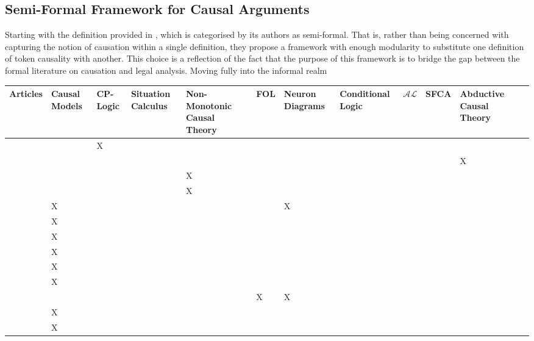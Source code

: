 \documentclass[11pt,a4paper]{book}
\theoremstyle{definition}
\theoremstyle{definition}
\theoremstyle{definition}
\theoremstyle{remark}
\begin{document}
\subsection{Semi-Formal Framework for Causal Arguments}

 Starting with the definition provided in \parencite{liepicna2020arguing}, which is categorised by its authors as semi-formal. That is, rather than being concerned with capturing the notion of causation within a single definition, they propose a framework with enough modularity to substitute one definition of token causality with another. This choice is a reflection of the fact that the purpose of this framework is to bridge the gap between the formal literature on causation and legal analysis. Moving fully into the informal realm
 

\begin{table}
\centering
\tiny
\begin{tabular}{lp{1cm}p{1cm}p{1cm}p{1cm}p{1cm}p{1cm}p{1.1cm}p{1cm}p{1cm}p{1cm}p{1cm}}
\toprule
Articles & Causal Models	& CP-Logic	& Situation Calculus	&  Non-Monotonic Causal Theory & FOL & Neuron Diagrams & 	Conditional Logic	& $\mathcal{AL}$	& SFCA &  Abductive Causal Theory \\   
\midrule        
\cite{vennekens2010embracing} 	& 	& X	& 	& 	& 	& 	& 	& 	& 	& 	\\
 \cite{bex2010hybrid} 	& 	& 	& 	& 	& 	& 	& 	& 	& 	& X	\\
 \cite{lee2010representing}	& 	& 	& 	& X	& 	& 	& 	& 	& 	& 	\\
 \cite{lifschitz2010translating} 	& 	& 	& 	& X	& 	& 	& 	& 	& 	& 	\\
 \cite{glymour2010actual}	& X	& 	& 	& 	& 	& X	& 	& 	& 	& 	\\
 \cite{claassen2010causal} 	& X	& 	& 	& 	& 	& 	& 	& 	& 	& 	\\
 \cite{gerstenberg2010spreading}	& X	& 	& 	& 	& 	& 	& 	& 	& 	& 	\\
 \cite{halpern2011actual} 	& X	& 	& 	& 	& 	& 	& 	& 	& 	& 	\\
 \cite{shulz2011if} 	& X	& 	& 	& 	& 	& 	& 	& 	& 	& 	\\
 \cite{briggs2012interventionist}	& X	& 	& 	& 	& 	& 	& 	& 	& 	& 	\\
 \cite{baumgartner2013regularity} 	& 	& 	& 	& 	& X	& X	& 	& 	& 	& 	\\
 \cite{hyttinen2013discovering} 	& X	& 	& 	& 	& 	& 	& 	& 	& 	& 	\\
 \cite{halpern2015graded} 	& X	& 	& 	& 	& 	& 	& 	& 	& 	& 	\\

\end{tabular}
\end{table}
\end{document}
